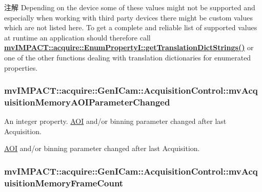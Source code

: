 \begin{DoxyNote}{注解}
Depending on the device some of these values might not be supported and especially when working with third party devices there might be custom values which are not listed here. To get a complete and reliable list of supported values at runtime an application should therefore call {\bfseries \hyperlink{classmv_i_m_p_a_c_t_1_1acquire_1_1_enum_property_i_a0ba6ccbf5ee69784d5d0b537924d26b6}{mv\+I\+M\+P\+A\+C\+T\+::acquire\+::\+Enum\+Property\+I\+::get\+Translation\+Dict\+Strings()}} or one of the other functions dealing with translation dictionaries for enumerated properties. 
\end{DoxyNote}
\hypertarget{classmv_i_m_p_a_c_t_1_1acquire_1_1_gen_i_cam_1_1_acquisition_control_aa56de2ea0f33f1de69f8a3594c57d8c0}{
\subsubsection[{mv\+Acquisition\+Memory\+A\+O\+I\+Parameter\+Changed}]{ mv\+I\+M\+P\+A\+C\+T\+::acquire\+::\+Gen\+I\+Cam\+::\+Acquisition\+Control\+::mv\+Acquisition\+Memory\+A\+O\+I\+Parameter\+Changed}}\label{classmv_i_m_p_a_c_t_1_1acquire_1_1_gen_i_cam_1_1_acquisition_control_aa56de2ea0f33f1de69f8a3594c57d8c0}


An integer property. \hyperlink{struct_a_o_i}{A\+O\+I} and/or binning parameter changed after last Acquisition. 

\hyperlink{struct_a_o_i}{A\+O\+I} and/or binning parameter changed after last Acquisition. \hypertarget{classmv_i_m_p_a_c_t_1_1acquire_1_1_gen_i_cam_1_1_acquisition_control_a6260d5499a91791d8eb9db5cc246c485}{
\subsubsection[{mv\+Acquisition\+Memory\+Frame\+Count}]{ mv\+I\+M\+P\+A\+C\+T\+::acquire\+::\+Gen\+I\+Cam\+::\+Acquisition\+Control\+::mv\+Acquisition\+Memory\+Frame\+Count}}\label{classmv_i_m_p_a_c_t_1_1acquire_1_1_gen_i_cam_1_1_acquisition_control_a6260d5499a91791d8eb9db5cc246c485}


